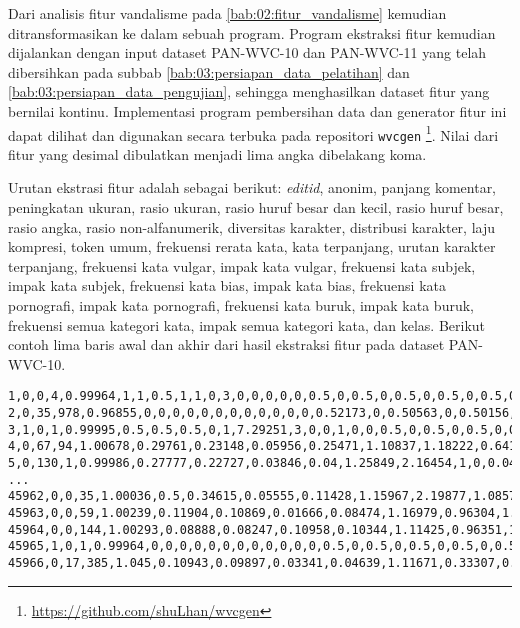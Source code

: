 Dari analisis fitur vandalisme pada \ref{bab:02:fitur_vandalisme} kemudian
ditransformasikan ke dalam sebuah program.
Program ekstraksi fitur kemudian dijalankan dengan input dataset PAN-WVC-10
dan PAN-WVC-11 yang telah dibersihkan pada subbab
\ref{bab:03:persiapan_data_pelatihan} dan
\ref{bab:03:persiapan_data_pengujian},
sehingga menghasilkan dataset fitur yang bernilai kontinu.
Implementasi program pembersihan data dan generator fitur ini dapat dilihat dan
digunakan secara terbuka pada repositori \texttt{wvcgen}
\footnote{\url{https://github.com/shuLhan/wvcgen}}.
Nilai dari fitur yang desimal dibulatkan menjadi lima angka dibelakang koma.

Urutan ekstrasi fitur adalah sebagai berikut: \textit{editid}, anonim,
panjang komentar, peningkatan ukuran, rasio ukuran, rasio huruf besar dan
kecil, rasio huruf besar, rasio angka, rasio non-alfanumerik, diversitas
karakter, distribusi karakter, laju kompresi, token umum, frekuensi rerata
kata, kata terpanjang, urutan karakter terpanjang, frekuensi kata vulgar, impak
kata vulgar, frekuensi kata subjek, impak kata subjek, frekuensi kata bias,
impak kata bias, frekuensi kata pornografi, impak kata pornografi, frekuensi
kata buruk, impak kata buruk, frekuensi semua kategori kata, impak semua
kategori kata, dan kelas. Berikut contoh lima baris awal dan akhir dari hasil
ekstraksi fitur pada dataset PAN-WVC-10.

\begin{lstlisting}[style=data,basicstyle=\footnotesize\ttfamily]
1,0,0,4,0.99964,1,1,0.5,1,1,0,3,0,0,0,0,0,0.5,0,0.5,0,0.5,0,0.5,0,0.5,0,0.5,0
2,0,35,978,0.96855,0,0,0,0,0,0,0,0,0,0,0,0,0.52173,0,0.50563,0,0.50156,0,0.5,0,0.5283,0,0.50534,0
3,1,0,1,0.99995,0.5,0.5,0.5,0,1,7.29251,3,0,0,1,0,0,0.5,0,0.5,0,0.5,0,0.5,0,0.5,0,0.5,0
4,0,67,94,1.00678,0.29761,0.23148,0.05956,0.25471,1.10837,1.18222,0.6415,12,0.02692,10,2,0,0.65,0.3,0.72838,0,0.60606,0,0.5,0,0.77906,0,0.72837,0
5,0,130,1,0.99986,0.27777,0.22727,0.03846,0.04,1.25849,2.16454,1,0,0.04682,8,0,0,0.5,0.5,0.5,0,0.5,0,0.5,0,0.5,0,0.5,0
...
45962,0,0,35,1.00036,0.5,0.34615,0.05555,0.11428,1.15967,2.19877,1.08571,1,0.06435,11,2,0,0.5,0.83333,0.5,0,0.5,0,0.5,0,0.5,0,0.5,0
45963,0,0,59,1.00239,0.11904,0.10869,0.01666,0.08474,1.16979,0.96304,1.03389,3,0.08203,10,2,0,0.5,0.75,0.49878,0,0.5,0,0.5,0,0.5,0,0.49891,0
45964,0,0,144,1.00293,0.08888,0.08247,0.10958,0.10344,1.11425,0.96351,1.01379,3,0,0,2,0,0.5,0,0.5,0,0.5,0,0.5,0,0.5,0,0.5,0
45965,1,0,1,0.99964,0,0,0,0,0,0,0,0,0,0,0,0,0.5,0,0.5,0,0.5,0,0.5,0,0.5,0,0.5,0
45966,0,17,385,1.045,0.10943,0.09897,0.03341,0.04639,1.11671,0.33307,0.76288,4,0.0851,11,2,0.01562,0.5,0.54687,0.5,0,0.5,0,0.5,0,0.5,0,0.5,0
\end{lstlisting}

